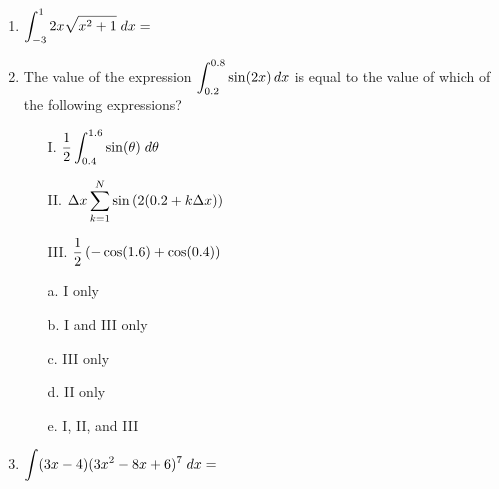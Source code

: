 \documentclass[12pt]{report}
\begin{document}
\begin{enumerate}
\item $\displaystyle \int_{-3}^{1} 2x\sqrt{x^2+1}\; dx =$

\pagebreak

\item The value of the expression $\displaystyle \int_{0.2}^{0.8}\sin(2x)\,dx$ is equal to the value of which of the following expressions? \vspace{0.5cm}

\begin{enumerate}
\item [I.] $\displaystyle \displaystyle \frac{1}{2}\int_{0.4}^{1.6}\sin(\theta)\;d\theta$ \vspace{0.2cm}
\item [II.]  $\displaystyle \Delta x \sum_{k=1}^N \sin\left(2(0.2 + k\Delta x)\right)$ \vspace{0.2cm}
\item [III.] $\displaystyle \frac{1}{2}\left(-\cos(1.6)+\cos(0.4)\right)$ \vspace{0.5cm}
\end{enumerate}
\begin{enumerate}
\item[a.] I only
\item[b.] I and III only
\item[c.] III only
\item[d.] II only
\item[e.] I, II, and III
\end{enumerate}



\item $\displaystyle \int (3x-4)(3x^2-8x+6)^7\;dx =$



\end{enumerate}
\end{document}

